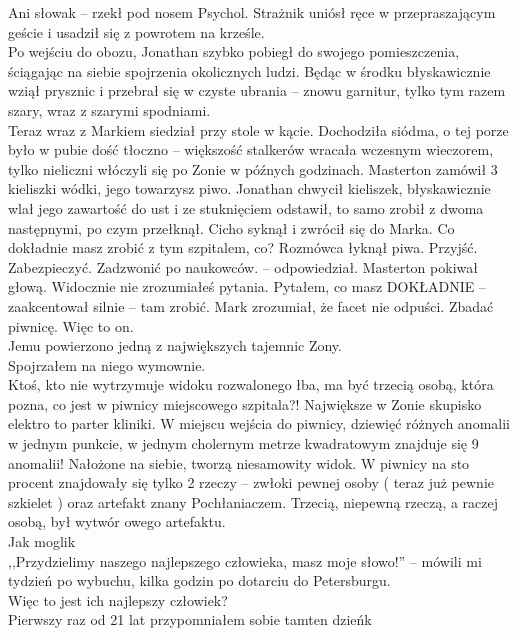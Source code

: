 \documentclass[../MAIN.tex]{subfiles}
\begin{document}
%
\sx Ani słowa\3k -- rzekł pod nosem Psychol.
\qd
Strażnik uniósł ręce w przepraszającym geście i usadził się z powrotem na krześle. \\
Po wejściu do obozu, Jonathan szybko pobiegł do swojego pomieszczenia, ściągając na siebie spojrzenia okolicznych ludzi. Będąc w środku błyskawicznie wziął prysznic i przebrał się w czyste ubrania -- znowu garnitur, tylko tym razem szary, wraz z szarymi spodniami. \\
Teraz wraz z Markiem siedział przy stole w kącie. Dochodziła siódma, o tej porze było w pubie dość tłoczno -- większość stalkerów wracała wczesnym wieczorem, tylko nieliczni włóczyli się po Zonie w późnych godzinach. Masterton zamówił 3 kieliszki wódki, jego towarzysz piwo. Jonathan chwycił kieliszek, błyskawicznie wlał jego zawartość do ust i ze stuknięciem odstawił, to samo zrobił z dwoma następnymi, po czym przełknął. Cicho syknął i zwrócił się do Marka.
%
\sx Co dokładnie masz zrobić z tym szpitalem, co?
\qd
Rozmówca łyknął piwa.
\sx Przyjść. Zabezpieczyć. Zadzwonić po naukowców. -- odpowiedział. \qd
Masterton pokiwał głową.
\sx Widocznie nie zrozumiałeś pytania. Pytałem, co masz DOKŁADNIE -- zaakcentował silnie -- tam zrobić. \qd
Mark zrozumiał, że facet nie odpuści.
\sx Zbadać piwnicę. \qd
%
%
Więc to on. \\
Jemu powierzono jedną z największych tajemnic Zony. \\
Spojrzałem na niego wymownie. \\
Ktoś, kto nie wytrzymuje widoku rozwalonego łba, ma być trzecią osobą, która pozna, co jest w piwnicy miejscowego szpitala?!
Największe w Zonie skupisko elektro to parter kliniki. W miejscu wejścia do piwnicy, dziewięć różnych anomalii w jednym punkcie, w jednym cholernym metrze kwadratowym znajduje się 9 anomalii! Nałożone na siebie, tworzą niesamowity widok.
W piwnicy na sto procent znajdowały się tylko 2 rzeczy -- zwłoki pewnej osoby ( teraz już pewnie szkielet ) oraz artefakt znany Pochłaniaczem. Trzecią, niepewną rzeczą, a raczej osobą, był wytwór owego artefaktu. \\
Jak mogli\3k \\
,,Przydzielimy naszego najlepszego człowieka, masz moje słowo!'' -- mówili mi tydzień po wybuchu, kilka godzin po dotarciu do Petersburgu.\\
Więc to jest ich najlepszy człowiek?\\
Pierwszy raz od 21 lat przypomniałem sobie tamten dzień\3k
\end{document}
